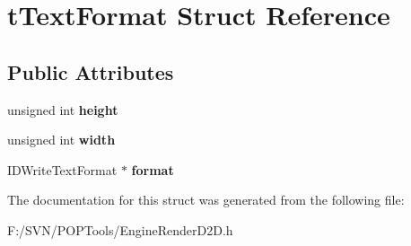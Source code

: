 \hypertarget{structt_text_format}{\section{t\-Text\-Format Struct Reference}
\label{structt_text_format}
}
\subsection*{Public Attributes}
\begin{DoxyCompactItemize}
\item 
\hypertarget{structt_text_format_af2ccb01964ce459f72595f0f68bdc4cf}{unsigned int {\bfseries height}}\label{structt_text_format_af2ccb01964ce459f72595f0f68bdc4cf}

\item 
\hypertarget{structt_text_format_abf371e45d870ec89d887b31fef84e886}{unsigned int {\bfseries width}}\label{structt_text_format_abf371e45d870ec89d887b31fef84e886}

\item 
\hypertarget{structt_text_format_ac18802e53b1b6568c278d5defa7a49e9}{I\-D\-Write\-Text\-Format $\ast$ {\bfseries format}}\label{structt_text_format_ac18802e53b1b6568c278d5defa7a49e9}

\end{DoxyCompactItemize}


The documentation for this struct was generated from the following file\-:\begin{DoxyCompactItemize}
\item 
F\-:/\-S\-V\-N/\-P\-O\-P\-Tools/Engine\-Render\-D2\-D.\-h\end{DoxyCompactItemize}
